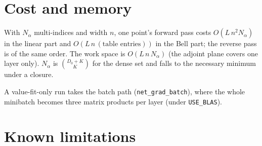 \documentclass[10pt,a4paper]{article}
\newcommand{\code}[1]{\texttt{#1}}
\begin{document}
\section{Cost and memory}

With $N_\alpha$ multi-indices and width $n$, one point's forward pass
costs $O(L\,n^2 N_\alpha)$ in the linear part and
$O(L\,n\,(\text{table entries}))$ in the Bell part; the reverse pass
is of the same order. The work space is $O(L\,n\,N_\alpha)$ (the
adjoint plane covers one layer only). $N_\alpha$ is
$\binom{D_0+K}{K}$ for the dense set and falls to the necessary
minimum under a closure.

A value-fit-only run takes the batch path (\code{net\_grad\_batch}),
where the whole minibatch becomes three matrix products per layer
(under \code{USE\_BLAS}).

\section{Known limitations}
\label{sec:limits}
\end{document}
